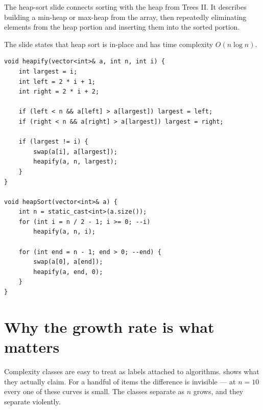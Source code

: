The heap-sort slide connects sorting with the heap from Trees II. It describes building a min-heap or max-heap from the array, then repeatedly eliminating elements from the heap portion and inserting them into the sorted portion.

The slide states that heap sort is in-place and has time complexity $O(n\log n)$.

\begin{lstlisting}
void heapify(vector<int>& a, int n, int i) {
    int largest = i;
    int left = 2 * i + 1;
    int right = 2 * i + 2;

    if (left < n && a[left] > a[largest]) largest = left;
    if (right < n && a[right] > a[largest]) largest = right;

    if (largest != i) {
        swap(a[i], a[largest]);
        heapify(a, n, largest);
    }
}

void heapSort(vector<int>& a) {
    int n = static_cast<int>(a.size());
    for (int i = n / 2 - 1; i >= 0; --i)
        heapify(a, n, i);

    for (int end = n - 1; end > 0; --end) {
        swap(a[0], a[end]);
        heapify(a, end, 0);
    }
}
\end{lstlisting}

\clearpage
\section{Why the growth rate is what matters}

Complexity classes are easy to treat as labels attached to algorithms. 
shows what they actually claim. For a handful of items the difference is invisible --- at
$n=10$ every one of these curves is small. The classes separate as $n$ grows, and they
separate violently.

